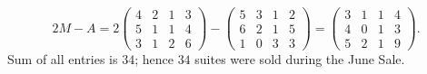 \begin{Exercise}
\begin{solution}
$$
2M - A
= 2\begin{pmatrix}
4 & 2 & 1 & 3 \\
5 & 1 & 1 & 4 \\
3 & 1 & 2 & 6
\end{pmatrix} - \begin{pmatrix}
5 & 3 & 1 & 2 \\
6 & 2 & 1 & 5 \\
1 & 0 & 3 & 3
\end{pmatrix}
= \begin{pmatrix}
3 & 1 & 1 & 4 \\
4 & 0 & 1 & 3 \\
5 & 2 & 1 & 9
\end{pmatrix}.
$$
Sum of all entries is $34$; hence $34$ suites were sold during the June Sale.
\end{solution}
\end{Exercise}